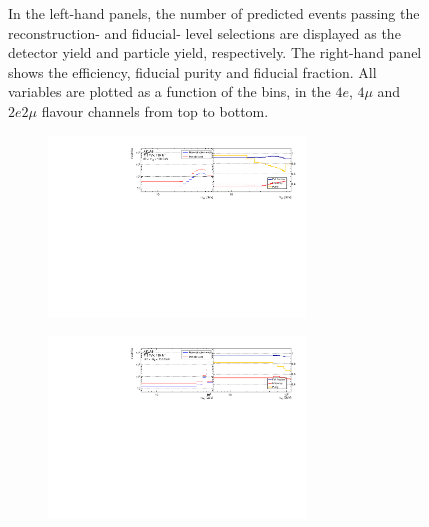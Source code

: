\begin{figure}[htb]
\begin{subfigure}{.99\textwidth}
    \end{subfigure}
    \caption{In the left-hand panels, the number of predicted events passing the reconstruction- and fiducial- level selections are displayed as the detector yield and particle yield, respectively. The right-hand panel shows the efficiency, fiducial purity and fiducial fraction. All variables are plotted as a function of the \mFourL bins, in the $4e$, $4\mu$ and $2e2\mu$ flavour channels from top to bottom.
    \label{fig:chunf}}
\end{figure}  

\FloatBarrier
\clearpage

\begin{figure}[htb]
    \centering 
    \begin{subfigure}{.99\textwidth}\centering
        \includegraphics[width = 0.75\textwidth]{Figures/m4l/UnfoldingStudies/v014_inputs/m12_m4l60-100inputs.pdf}
    \end{subfigure}
    \begin{subfigure}{.99\textwidth}\centering
        \includegraphics[width = 0.75\textwidth]{Figures/m4l/UnfoldingStudies/v014_inputs/m12_m4l120-130inputs.pdf}

\end{subfigure}
\end{figure}
